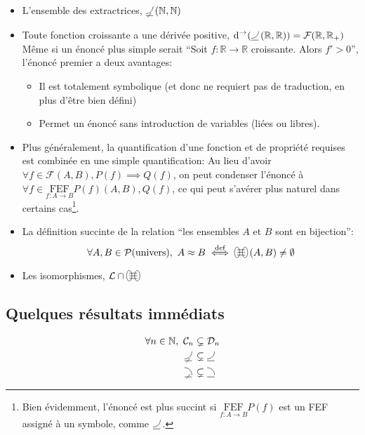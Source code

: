 \documentclass{article}
\newcommand{\R}{{\mathbb R}}
\newcommand{\FEF}[1]{\underset{f:A\to B}{\text{FEF}}#1}
\newcommand{\N}{{\mathbb N}}
\newcommand{\cC}{{\mathcal C}}
\newcommand{\cD}{{\mathcal D}}
\newcommand{\cF}{{\mathcal F}}
\newcommand{\cP}{{\mathcal P}}
\newcommand{\decreasingfunctions}{%
	\begin{tikzpicture}[scale=1.75, baseline=0]%
		\draw (0,-0.25ex) -- (1ex,-0.25ex);%
		\draw (1ex,0) arc (0:90:1ex);%
	\end{tikzpicture}\,%
}
\newcommand{\strictlydecreasingfunctions}{%
	\begin{tikzpicture}[scale=1.75, baseline=0]%
		\draw (0,-0.25ex) -- (1ex,-0.25ex);%
		\draw (1ex,0) arc (0:90:1ex);%
		\draw (0.75ex,0.125ex) -- (0.25ex,-0.5ex);%
	\end{tikzpicture}\,%
}
\newcommand{\increasingfunctions}{%
	\begin{tikzpicture}[scale=1.75, baseline=0]%
		\draw (0,-0.25ex) -- (1ex,-0.25ex);%
		\draw (0,0) arc (-90:0:1ex);%
	\end{tikzpicture}\,%
}
\newcommand{\strictlyincreasingfunctions}{%
	\begin{tikzpicture}[scale=1.75, baseline=0]%
		\draw (0,-0.25ex) -- (1ex,-0.25ex);%
		\draw (0,0) arc (-90:0:1ex);%
		\draw (0.75ex,0.125ex) -- (0.25ex,-0.5ex);%
	\end{tikzpicture}\,%
}
\newcommand{\bijections}{%
	\begin{tikzpicture}[scale=1.25, baseline=-0.75ex]%
		\draw (-0.75ex,0) ellipse (0.5ex and 1ex);
		\draw (0.75ex,0) ellipse (0.5ex and 1ex);
		\draw (-0.75ex,0.5ex) -- (0.75ex,0.5ex);
		\draw (-0.75ex,0) -- (0.75ex,0);
		\draw (-0.75ex,-0.5ex) -- (0.75ex,-0.5ex);
	\end{tikzpicture}\,%
}
\begin{document}
\begin{itemize}
	\item L'ensemble des extractrices, $\strictlyincreasingfunctions(\N, \N)$
	\item Toute fonction croissante a une dérivée positive, $\operatorname{\text{d}}^{\to}(\increasingfunctions(\R, \R)) = \cF(\R, \R_+)$
		Même si un énoncé plus simple serait “Soit $f:\R\to \R$ croissante. Alors $f' > 0$”, l'énoncé premier a deux avantages:
		\begin{itemize}
			\item Il est totalement symbolique (et donc ne requiert pas de traduction, en plus d'être bien défini)
			\item Permet un énoncé sans introduction de variables (liées ou libres).
		\end{itemize}
	\item Plus généralement, la quantification d'une fonction et de propriété requises est combinée en une simple quantification:
		Au lieu d'avoir $\forall f \in \cF(A, B), P(f) \implies Q(f)$, on peut condenser l'énoncé à $\forall f \in \FEF{P(f)}(A, B), Q(f)$, ce qui peut s'avérer plus naturel dans certains cas\footnote{Bien évidemment, l'énoncé est plus succint si $\FEF{P(f)}$ est un FEF assigné à un symbole, comme $\increasingfunctions$.}.
	\item La définition succinte de la relation “les ensembles $A$ et $B$ sont en bijection”:
		\[
			\forall A, B\in \cP(\text{univers}),\ A \approx B \overset{\text{def}}{\iff} \bijections(A, B) \neq \emptyset
		\] 
	\item Les isomorphismes, $\mathcal{L} \cap \bijections$
\end{itemize}

\subsection{Quelques résultats immédiats}

\begin{align*}
	\forall n\in \N,\ \cC_n &\subsetneq \cD_n \\
	\strictlyincreasingfunctions &\subsetneq \increasingfunctions \\
	\strictlydecreasingfunctions &\subsetneq \decreasingfunctions \\
\end{align*}


\newpage
\tableofcontents
\end{document}
